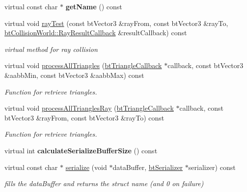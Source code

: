 \begin{DoxyCompactItemize}
virtual const char $\ast$ {\bfseries get\+Name} () const
\item 
\mbox{\label{classbtGImpactMeshShape_a3f68c08b8d157a46d37088105eb1d5c1}} 
virtual void \hyperlink{classbtGImpactMeshShape_a3f68c08b8d157a46d37088105eb1d5c1}{ray\+Test} (const bt\+Vector3 \&ray\+From, const bt\+Vector3 \&ray\+To, \hyperlink{structbtCollisionWorld_1_1RayResultCallback}{bt\+Collision\+World\+::\+Ray\+Result\+Callback} \&result\+Callback) const
\begin{DoxyCompactList}\small\item\em virtual method for ray collision \end{DoxyCompactList}\item 
virtual void \hyperlink{classbtGImpactMeshShape_aa2963b35e88c0f423b4b7b10540a5f6b}{process\+All\+Triangles} (\hyperlink{classbtTriangleCallback}{bt\+Triangle\+Callback} $\ast$callback, const bt\+Vector3 \&aabb\+Min, const bt\+Vector3 \&aabb\+Max) const
\begin{DoxyCompactList}\small\item\em Function for retrieve triangles. \end{DoxyCompactList}\item 
virtual void \hyperlink{classbtGImpactMeshShape_ab7221f209f9d10d2f1eb80cca5aee55d}{process\+All\+Triangles\+Ray} (\hyperlink{classbtTriangleCallback}{bt\+Triangle\+Callback} $\ast$callback, const bt\+Vector3 \&ray\+From, const bt\+Vector3 \&ray\+To) const
\begin{DoxyCompactList}\small\item\em Function for retrieve triangles. \end{DoxyCompactList}\item 
\mbox{\label{classbtGImpactMeshShape_abc682b21b258b9edf82d1f5a21ec37fd}} 
virtual int {\bfseries calculate\+Serialize\+Buffer\+Size} () const
\item 
\mbox{\label{classbtGImpactMeshShape_af7a49e08ffba1adfd6981e224eba9430}} 
virtual const char $\ast$ \hyperlink{classbtGImpactMeshShape_af7a49e08ffba1adfd6981e224eba9430}{serialize} (void $\ast$data\+Buffer, \hyperlink{classbtSerializer}{bt\+Serializer} $\ast$serializer) const
\begin{DoxyCompactList}\small\item\em fills the data\+Buffer and returns the struct name (and 0 on failure) \end{DoxyCompactList}\item 

\end{DoxyCompactItemize}
